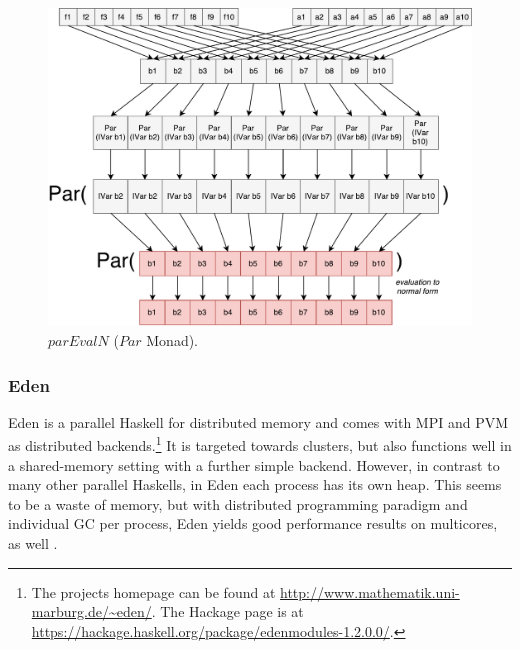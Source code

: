 \documentclass{jfp1}
\newcommand{\Conid}[1]{\mathit{#1}}
\newcommand{\Varid}[1]{\mathit{#1}}
\renewcommand{\cite}[1]{\citep{#1}}
\begin{document}
\begin{figure}[t]
	\includegraphics[scale=0.5]{images/parEvalNParMonad}
	\caption{\ensuremath{\Varid{parEvalN}} (\ensuremath{\Conid{Par}} Monad).}
	\label{fig:parEvalNParMonadImg}
\end{figure}

\subsubsection{Eden}
Eden \cite{eden,Loogen2012} is a parallel Haskell for distributed memory and comes with MPI and PVM as distributed backends.\footnote{The projects homepage can be found at \url{http://www.mathematik.uni-marburg.de/~eden/}. The Hackage page is at \url{https://hackage.haskell.org/package/edenmodules-1.2.0.0/}.} It is targeted towards clusters, but also functions well in a shared-memory setting with a further simple backend. However, in contrast to many other parallel Haskells, in Eden each process has its own heap. This seems to be a waste of memory, but with distributed programming paradigm and individual GC per process, Eden yields good performance results on multicores, as well \cite{arcs-dc,aswad2009low}.
\end{document}
